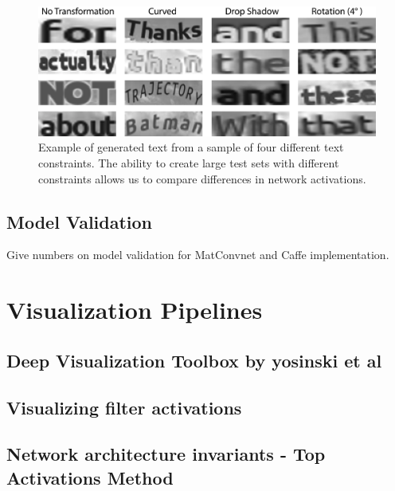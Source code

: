 \documentclass[10pt,twocolumn,letterpaper]{article}
\begin{document}
\begin{figure}
\includegraphics[width=\columnwidth]{Figures/synthtext_outputs/synthext_outputs.png}
\caption{Example of generated text from a sample of four different text constraints. The ability to create large test sets with different constraints allows us to compare differences in network activations.}
\label{fig:genText}
\end{figure}



\subsection{Model Validation}
Give numbers on model validation for MatConvnet and Caffe implementation.

\section{Visualization Pipelines}

\subsection{Deep Visualization Toolbox by yosinski et al}

\subsection{Visualizing filter activations}

\subsection{Network architecture invariants - Top Activations Method}
\end{document}
